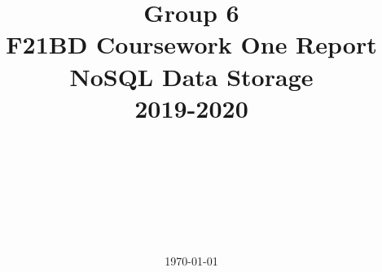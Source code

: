 \documentclass[12pt, a4paper]{report}
\title{Group 6\\ F21BD Coursework One Report\\NoSQL Data Storage\\2019-2020}
\author{
\color{namesColor}{Ashwini Rao} \\
\color{namesColor}{HWU\_ID}
\color{namesColor}{DEGREE\_PROGRAMME}
\and
\color{namesColor}{Anwar Rizvi} \\
\color{namesColor}{HWU\_ID} \\
\color{namesColor}{DEGREE\_PROGRAMME}
\and
\color{namesColor}{Timothy Makobu} \\ 
\color{namesColor}{H00296017} \\
\color{namesColor}{MSc. Software Engineering}
}
\date{\today}
\begin{document}
\maketitle	
\tableofcontents

\begin{abstract}
	
\end{abstract}


\printbibliography
	
\end{document}
